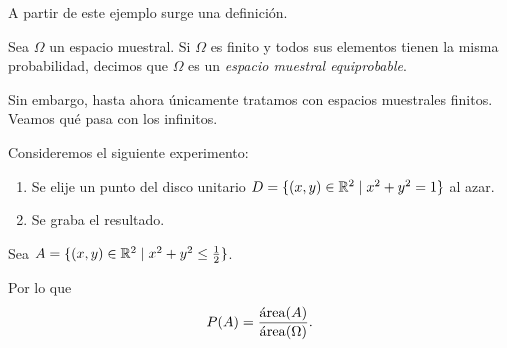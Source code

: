 A partir de este ejemplo surge una definición.

\begin{definition}
    Sea $\Omega$ un espacio muestral. Si $\Omega$ es finito y todos sus elementos tienen la misma probabilidad, decimos que $\Omega$ es un \emph{espacio muestral equiprobable}.
\end{definition}

Sin embargo, hasta ahora únicamente tratamos con espacios muestrales finitos. Veamos qué pasa con los infinitos.

\begin{example}
    Consideremos el siguiente experimento:
    \begin{centeredvarwidth}
        \begin{enumerate}
            \item Se elije un punto del disco unitario $D = \{ (x, y) \in \mathbb{R}^2 \mid x^2 + y^2 = 1\}$ al azar.
            \item Se graba el resultado.
        \end{enumerate}
    \end{centeredvarwidth}

    Sea $A = \{ (x, y) \in \mathbb{R}^2 \mid x^2 + y^2 \leq \frac{1}{2} \}$.

    \begin{figure}[H]
        \centering
    \end{figure}

    Por lo que 
    \begin{equation*}
        P(A) = \frac{\operatorname{\acute{a}rea}(A)}{\operatorname{\acute{a}rea}(\Omega)}.
    \end{equation*}
\end{example}



